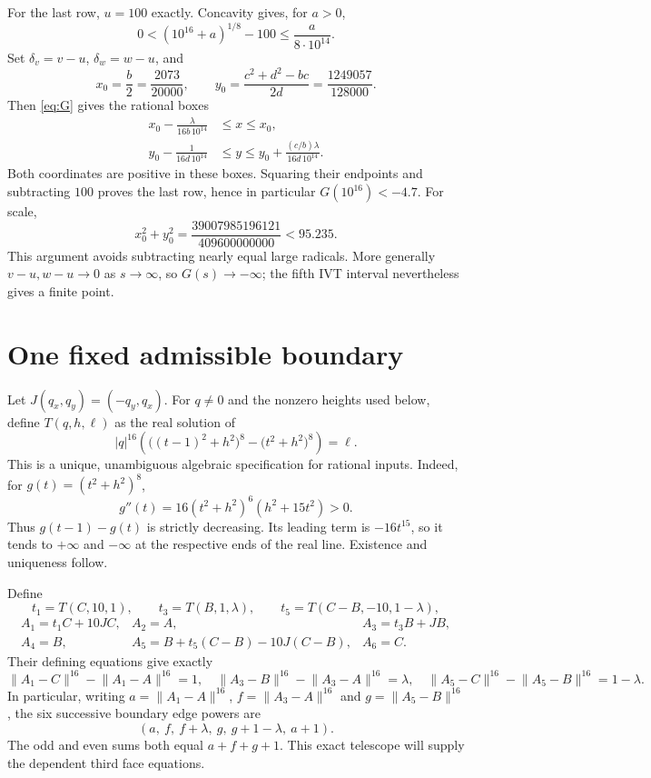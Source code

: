 \documentclass[11pt]{article}
\newcommand{\N}[2]{\lVert #1-#2\rVert^{16}}
\begin{document}
For the last row, $u=100$ exactly. Concavity gives, for $a>0$,
\[
 0<(10^{16}+a)^{1/8}-100\leq \frac{a}{8\cdot10^{14}}.
\]
Set $\delta_v=v-u$, $\delta_w=w-u$, and
\[
 x_0=\frac b2=\frac{2073}{20000},\qquad
 y_0=\frac{c^2+d^2-bc}{2d}=\frac{1249057}{128000}.
\]
Then \eqref{eq:G} gives the rational boxes
\begin{align*}
 x_0-\frac{\lambda}{16b\,10^{14}}&\leq x\leq x_0,\\
 y_0-\frac{1}{16d\,10^{14}}&\leq y\leq
 y_0+\frac{(c/b)\lambda}{16d\,10^{14}}.
\end{align*}
Both coordinates are positive in these boxes. Squaring their endpoints and subtracting $100$ proves the last row, hence in particular $G(10^{16})<-4.7$. For scale,
\[
 x_0^2+y_0^2=\frac{39007985196121}{409600000000}<95.235.
\]
This argument avoids subtracting nearly equal large radicals. More generally $v-u,w-u\to0$ as $s\to\infty$, so $G(s)\to-\infty$; the fifth IVT interval nevertheless gives a finite point.

\section{One fixed admissible boundary}
Let $J(q_x,q_y)=(-q_y,q_x)$. For $q\ne0$ and the nonzero heights used below, define $T(q,h,\ell)$ as the real solution of
\begin{equation}\label{eq:T}
 |q|^{16}\left(\big((t-1)^2+h^2\big)^8-\big(t^2+h^2\big)^8\right)=\ell.
\end{equation}
This is a unique, unambiguous algebraic specification for rational inputs. Indeed, for $g(t)=(t^2+h^2)^8$,
\[
 g''(t)=16(t^2+h^2)^6(h^2+15t^2)>0.
\]
Thus $g(t-1)-g(t)$ is strictly decreasing. Its leading term is $-16t^{15}$, so it tends to $+\infty$ and $-\infty$ at the respective ends of the real line. Existence and uniqueness follow.

Define
\[
 t_1=T(C,10,1),\qquad t_3=T(B,1,\lambda),\qquad
 t_5=T(C-B,-10,1-\lambda),
\]
\begin{equation}\label{eq:boundary}
\begin{array}{lll}
 A_1=t_1C+10JC,&A_2=A,&A_3=t_3B+JB,\\
 A_4=B,&A_5=B+t_5(C-B)-10J(C-B),&A_6=C.
\end{array}
\end{equation}
Their defining equations give exactly
\begin{equation}\label{eq:boundaryidentities}
 \N{A_1}{C}-\N{A_1}{A}=1,\quad
 \N{A_3}{B}-\N{A_3}{A}=\lambda,\quad
 \N{A_5}{C}-\N{A_5}{B}=1-\lambda.
\end{equation}
In particular, writing $a=\N{A_1}{A}$, $f=\N{A_3}{A}$ and $g=\N{A_5}{B}$, the six successive boundary edge powers are
\begin{equation}\label{eq:edges}
 (a,\ f,\ f+\lambda,\ g,\ g+1-\lambda,\ a+1).
\end{equation}
The odd and even sums both equal $a+f+g+1$. This exact telescope will supply the dependent third face equations.
\end{document}
